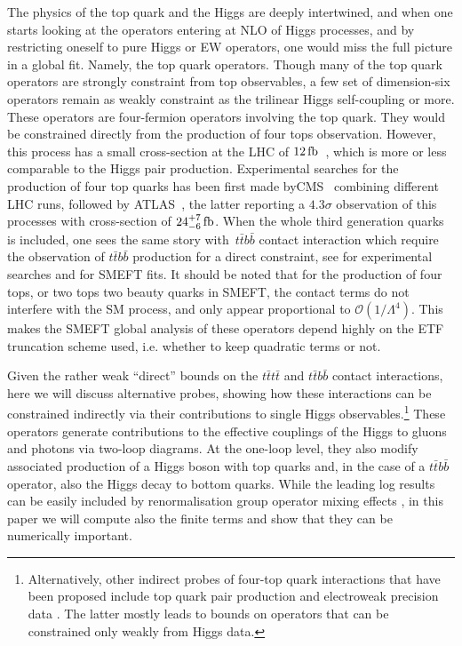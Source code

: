 \par The physics of the top quark and the Higgs are deeply intertwined, and when one starts looking at the operators entering at NLO of Higgs processes,  and by restricting oneself to pure Higgs or EW operators, one would miss the full picture in a global fit. Namely, the top quark operators. Though many of the top quark operators are strongly constraint from top observables, a few set of dimension-six operators remain as weakly constraint as the trilinear Higgs self-coupling or more. These operators are four-fermion operators involving the top quark. They would be constrained directly from the production of four tops observation. However, this process has a small cross-section at the LHC of $12\, \femtobarn$~\cite{Frederix:2017wme}, which is more or less comparable to the Higgs pair production. Experimental searches for the production of four top quarks has been first made byCMS~\cite{Sirunyan:2019nxl} combining different LHC runs, followed by ATLAS~\cite{Aad:2020klt}, the latter reporting a $4.3 \sigma$ observation of this processes with cross-section of $24^{+7}_{-6}\,\femtobarn$. When the whole third generation quarks is included, one sees the same story with~$t\bar{t}b\bar{b}$  contact interaction which require the observation of $t\bar{t}b\bar{b}$ production for a direct constraint, see \cite{Sirunyan:2020kgar, ATLAS:2018gug} for experimental searches and \cite{DHondt:2018cww, for Hartland:2019bjb} for SMEFT fits. It should be noted that for the production of four tops, or two tops two beauty quarks in SMEFT, the contact terms do not interfere with the SM process, and only appear proportional to $\mathcal{O}(1/\Lambda^4)$. This makes the SMEFT global analysis of these operators depend highly on the ETF truncation scheme used, i.e. whether to keep quadratic terms or not. 
\par
Given the rather weak ``direct'' bounds on the $t\bar{t}t\bar{t}$ and $t\bar{t}b\bar{b}$ contact interactions, here we will discuss alternative probes, showing how these interactions can be constrained indirectly via their contributions to single Higgs observables.\footnote{Alternatively, other indirect probes of four-top quark interactions that have been proposed include top quark pair production \cite{Degrande:2020evl} and electroweak precision data \cite{deBlas:2015aea}. The latter mostly leads to bounds on operators that can be constrained only weakly from Higgs data.}
These operators generate contributions to the effective couplings of the Higgs to gluons and photons via two-loop diagrams. At the one-loop level, they also modify associated production of a Higgs boson with top quarks and, in the case of a $t\bar{t}b\bar{b}$ operator, also the Higgs decay to bottom quarks. While the leading log results can be easily included by renormalisation group operator mixing effects \cite{Jenkins:2013zja, Jenkins:2013wua, Alonso:2013hga}, in this paper we will compute also the finite terms and show that they can be numerically important.
